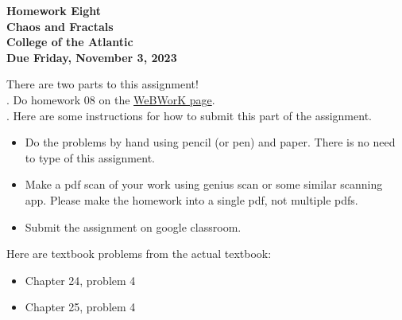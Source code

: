\documentclass[12pt]{article}
\begin{document}
\pagestyle{empty}
 
\begin{center}
{\LARGE {\bf Homework Eight}}\\
\bigskip
{\Large {\bf Chaos and Fractals}}\\
\bigskip
{\Large {\bf College of the Atlantic}}\\
\bigskip
{ {\bf Due Friday, November 3, 2023}}\\  
\end{center}
\medskip

\noindent There are two parts to this assignment!\\

. Do homework 08 on the 
\href{https://webwork-hosting.runestone.academy/webwork2/coa-feldman-es1026i-fall2023}{WeBWorK
  page}.\\

.  Here are some
instructions for how to submit this part of the assignment. 
\begin{itemize}
  \setlength{\itemsep}{-1mm}
\item Do the problems by hand using pencil (or pen) and paper.
  There is no need to type of this assignment.
\item Make a pdf scan of your work using genius scan or some
  similar scanning app.  Please make the homework into a single
  pdf, not multiple pdfs.
\item Submit the assignment on google classroom. %
\end{itemize}
\smallskip

\noindent Here are textbook problems from the actual textbook:\\

\begin{itemize}
\setlength{\itemsep}{-1mm}
\item Chapter 24, problem 4
\end{itemize}

\begin{itemize}
\setlength{\itemsep}{-1mm}
\item Chapter 25, problem 4
\end{itemize}
\end{document}
